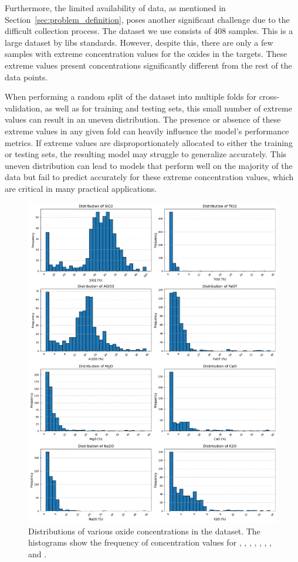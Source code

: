 Furthermore, the limited availability of data, as mentioned in Section~\ref{sec:problem_definition}, poses another significant challenge due to the difficult collection process.
The dataset we use consists of 408 samples. This is a large dataset by \gls{libs} standards.
However, despite this, there are only a few samples with extreme concentration values for the oxides in the targets.
These extreme values present concentrations significantly different from the rest of the data points. 

When performing a random split of the dataset into multiple folds for cross-validation, as well as for training and testing sets, this small number of extreme values can result in an uneven distribution.
The presence or absence of these extreme values in any given fold can heavily influence the model's performance metrics.
If extreme values are disproportionately allocated to either the training or testing sets, the resulting model may struggle to generalize accurately.
This uneven distribution can lead to models that perform well on the majority of the data but fail to predict accurately for these extreme concentration values, which are critical in many practical applications.

\begin{figure}[h!]
    \centering
    \includegraphics[width=\textwidth]{images/oxide_distributions.png}
    \caption{Distributions of various oxide concentrations in the dataset. The histograms show the frequency of concentration values for , , , , , , , and .}
    \label{fig:oxide_distributions}
\end{figure}


